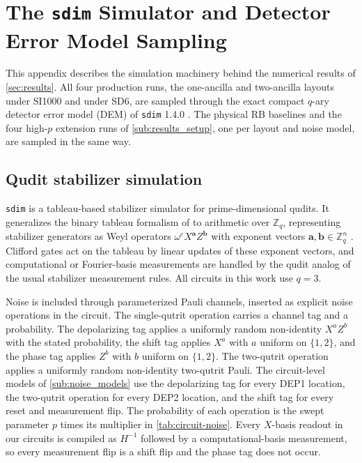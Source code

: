 \section{The \texttt{sdim} Simulator and Detector Error Model Sampling}
\label{sec:sdim-dem}

This appendix describes the simulation machinery behind the numerical results of \autoref{sec:results}. All four production runs, the one-ancilla and two-ancilla layouts under SI1000 and under SD6, are sampled through the exact compact $q$-ary detector error model (DEM) of \texttt{sdim} 1.4.0 \cite{sdim}. The physical RB baselines and the four high-$p$ extension runs of \autoref{sub:results_setup}, one per layout and noise model, are sampled in the same way.

\subsection{Qudit stabilizer simulation}

\texttt{sdim} \cite{sdim} is a tableau-based stabilizer simulator for prime-dimensional qudits. It generalizes the binary tableau formalism of \cite{Aaronson2004} to arithmetic over $\mathbb{Z}_q$, representing stabilizer generators as Weyl operators $\omega^c X^{\mathbf{a}} Z^{\mathbf{b}}$ with exponent vectors $\mathbf{a}, \mathbf{b} \in \mathbb{Z}_q^n$ \cite{Gottesman1999,Hostens2005}. Clifford gates act on the tableau by linear updates of these exponent vectors, and computational or Fourier-basis measurements are handled by the qudit analog of the usual stabilizer measurement rules. All circuits in this work use $q=3$.

Noise is included through parameterized Pauli channels, inserted as explicit noise operations in the circuit. The single-qutrit operation carries a channel tag and a probability. The depolarizing tag applies a uniformly random non-identity $X^a Z^b$ with the stated probability, the shift tag applies $X^a$ with $a$ uniform on $\{1,2\}$, and the phase tag applies $Z^b$ with $b$ uniform on $\{1,2\}$. The two-qutrit operation applies a uniformly random non-identity two-qutrit Pauli. The circuit-level models of \autoref{sub:noise_models} use the depolarizing tag for every DEP1 location, the two-qutrit operation for every DEP2 location, and the shift tag for every reset and measurement flip. The probability of each operation is the swept parameter $p$ times its multiplier in \autoref{tab:circuit-noise}. Every $X$-basis readout in our circuits is compiled as $H^{-1}$ followed by a computational-basis measurement, so every measurement flip is a shift flip and the phase tag does not occur.

